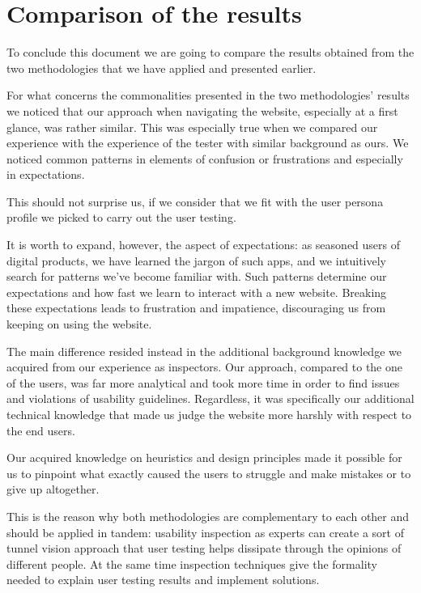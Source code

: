 \section{Comparison of the results}
To conclude this document we are going to compare the results obtained from the two methodologies that we have applied and presented earlier.

For what concerns the commonalities presented in the two methodologies' results we noticed that our approach when navigating the website, especially at a first glance, was rather similar. This was especially true when we compared our experience with the experience of the tester with similar background as ours. We noticed common patterns in elements of confusion or frustrations and especially in expectations.

 This should not surprise us, if we consider that we fit with the user persona profile we picked to carry out the user testing.

It is worth to expand, however, the aspect of expectations: as seasoned users of digital products, we have learned the jargon of such apps, and we intuitively search for patterns we've become familiar with. Such patterns determine our expectations and how fast we learn to interact with a new website. Breaking these expectations leads to frustration and impatience, discouraging us from keeping on using the website.


The main difference resided instead in the additional background knowledge we acquired from our experience as inspectors. Our approach, compared to the one of the users, was far more analytical and took more time in order to find issues and violations of usability guidelines. Regardless, it was specifically our additional technical knowledge that made us judge the website more harshly with respect to the end users.

Our acquired knowledge on heuristics and design principles made it possible for us to pinpoint what exactly caused the users to struggle and make mistakes or to give up altogether.

This is the reason why both methodologies are complementary to each other and should be applied in tandem: usability inspection as experts can create a sort of tunnel vision approach that user testing helps dissipate through the opinions of different people. At the same time inspection techniques give the formality needed to explain user testing results and implement solutions.

